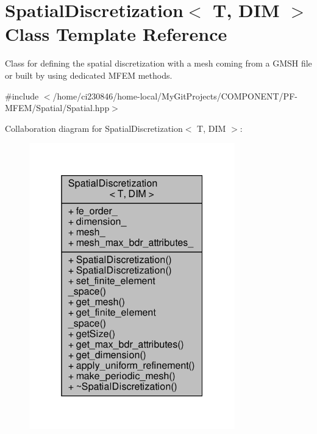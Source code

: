 \hypertarget{classSpatialDiscretization}{}\section{Spatial\+Discretization$<$ T, D\+IM $>$ Class Template Reference}
\label{classSpatialDiscretization}


Class for defining the spatial discretization with a mesh coming from a G\+M\+SH file or built by using dedicated M\+F\+EM methods.  




{\ttfamily \#include $<$/home/ci230846/home-\/local/\+My\+Git\+Projects/\+C\+O\+M\+P\+O\+N\+E\+N\+T/\+P\+F-\/\+M\+F\+E\+M/\+Spatial/\+Spatial.\+hpp$>$}



Collaboration diagram for Spatial\+Discretization$<$ T, D\+IM $>$\+:\nopagebreak
\begin{figure}[H]
\begin{center}
\leavevmode
\includegraphics[width=253pt]{classSpatialDiscretization__coll__graph}
\end{center}
\end{figure}
